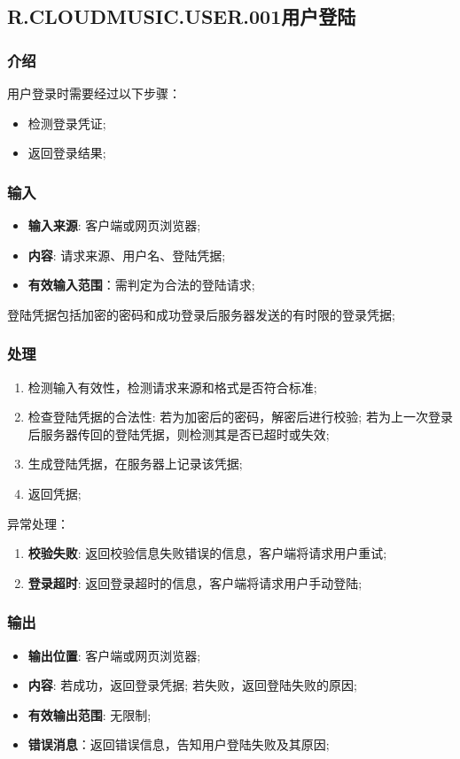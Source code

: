 \subsection{R.CLOUDMUSIC.USER.001用户登陆}
\subsubsection{介绍}
用户登录时需要经过以下步骤：
	\begin{itemize}
		\item 检测登录凭证;
		\item 返回登录结果;
	\end{itemize}
\subsubsection{输入}
	\begin{itemize}
		\item \textbf{输入来源}: 客户端或网页浏览器;
		\item \textbf{内容}: 请求来源、用户名、登陆凭据;
		\item \textbf{有效输入范围}：需判定为合法的登陆请求;
	\end{itemize}
	\noindent 登陆凭据包括加密的密码和成功登录后服务器发送的有时限的登录凭据;
\subsubsection{处理}
	\begin{enumerate}
		\item 检测输入有效性，检测请求来源和格式是否符合标准;
		\item 检查登陆凭据的合法性: 若为加密后的密码，解密后进行校验;
      若为上一次登录后服务器传回的登陆凭据，则检测其是否已超时或失效;
		\item 生成登陆凭据，在服务器上记录该凭据;
		\item 返回凭据;
	\end{enumerate}
	\noindent 异常处理：
	\begin{enumerate}
		\item \textbf{校验失败}: 返回校验信息失败错误的信息，客户端将请求用户重试;
		\item \textbf{登录超时}: 返回登录超时的信息，客户端将请求用户手动登陆;
	\end{enumerate}
\subsubsection{输出}
\begin{itemize}
	\item \textbf{输出位置}: 客户端或网页浏览器;
	\item \textbf{内容}: 若成功，返回登录凭据; 若失败，返回登陆失败的原因;
	\item \textbf{有效输出范围}: 无限制;
	\item \textbf{错误消息}：返回错误信息，告知用户登陆失败及其原因;
\end{itemize}

